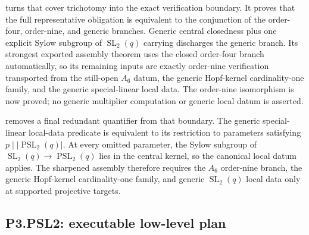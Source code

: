 \documentclass[11pt]{article}
\begin{document}
 turns
that cover trichotomy into the exact verification boundary.  It proves
that the full representative obligation is equivalent to the conjunction
of the order-four, order-nine, and generic branches.  Generic central
closedness plus one explicit Sylow subgroup of
\(\operatorname{SL}_2(q)\) carrying 
discharges the generic branch.  Its strongest exported assembly theorem
uses the closed order-four branch automatically, so its remaining inputs
are exactly order-nine verification transported from the still-open
\(A_6\) datum, the generic Hopf-kernel cardinality-one family, and the
generic special-linear local data.  The order-nine isomorphism is now
proved; no generic multiplier computation or generic local datum is
asserted.

removes a final redundant quantifier from that boundary.  The generic
special-linear local-data predicate is equivalent to its restriction to
parameters satisfying
\(p\mid\lvert\operatorname{PSL}_2(q)\rvert\).  At every omitted parameter,
the Sylow subgroup of
\(\operatorname{SL}_2(q)\to\operatorname{PSL}_2(q)\) lies in the central
kernel, so the canonical local datum applies.  The sharpened assembly
therefore requires the \(A_6\) order-nine branch, the generic Hopf-kernel
cardinality-one family, and generic \(\operatorname{SL}_2(q)\) local data
only at supported projective targets.

\subsection{P3.PSL2: executable low-level plan}
\end{document}

